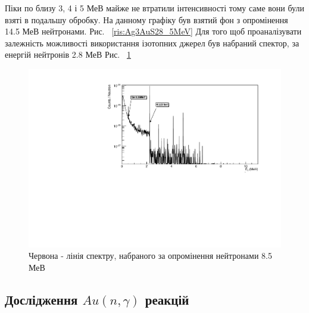 \documentclass[a4paper, 14pt]{article}
\numberwithin{equation}{section}
\numberwithin{table}{section}
\begin{document}
	Піки по близу 3, 4 і 5 МеВ майже не втратили інтенсивності тому саме вони були взяті в подальшу обробку. На данному графіку був взятий фон з опромінення 14.5 МеВ нейтронами. Рис. ~\ref{ris:Ag3AuS28_5MeV}
	Для того щоб проаналізувати залежність можливості використання ізотопних джерел був набраний спектор, за енергій нейтронів 2.8 МеВ Рис. ~\ref{ris:Ag3AuS22_8MeV}
	\begin{figure}[hbt!]
		\centering \includegraphics[width=1\textwidth]{res/AuAgS28MeV.pdf}
		\caption{Червона - лінія спектру, набраного за опромінення нейтронами 8.5 МеВ}
		\label{ris:Ag3AuS22_8MeV}	
	\end{figure} 

\subsection{Дослідження $Au(n, \gamma)$ реакцій} 
\end{document}
